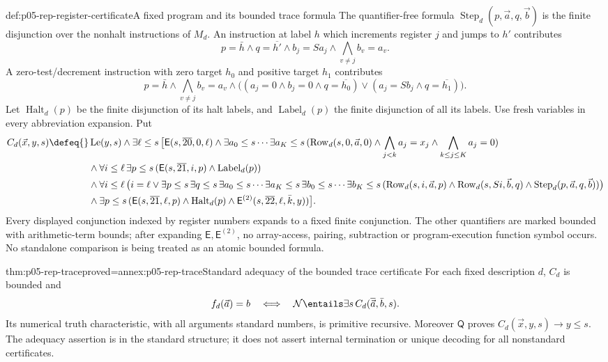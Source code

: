 \begin{hbdefinition}{def:p05-rep-register-certificate}{A fixed program and its bounded trace formula}
The quantifier-free formula
\(\operatorname{Step}_d(p,\vec a,q,\vec b)\) is the finite disjunction
over the nonhalt instructions of \(M_d\). An instruction at label \(h\)
which increments register \(j\) and jumps to \(h'\) contributes
\[
 p=\bar h\land q=\overline{h'}\land b_j=Sa_j
                       \land\bigwedge_{v\ne j}b_v=a_v.
\]
A zero-test/decrement instruction with zero target \(h_0\) and positive
target \(h_1\) contributes
\[
 p=\bar h\land\bigwedge_{v\ne j}b_v=a_v\land
 \bigl((a_j=0\land b_j=0\land q=\overline{h_0})\lor
       (a_j=Sb_j\land q=\overline{h_1})\bigr).
\]
Let \(\operatorname{Halt}_d(p)\) be the finite disjunction of its halt
labels, and \(\operatorname{Label}_d(p)\) the finite disjunction of all
its labels. Use fresh variables in every abbreviation expansion. Put
\[
\begin{aligned}
 C_d(\vec x,y,s)\defeq {}&\operatorname{Le}(y,s)\land
 \exists\ell\leq s\,\bigl[\mathsf E(s,\overline{20},0,\ell)\land
 \exists a_0\leq s\cdots\exists a_K\leq s\,
    (\operatorname{Row}_d(s,0,\vec a,0)\land
       \bigwedge_{j<k}a_j=x_j\land\bigwedge_{k\leq j\leq K}a_j=0)\\
 &\land\forall i\leq\ell\,\exists p\leq s\,
                         (\mathsf E(s,\overline{21},i,p)
                                      \land\operatorname{Label}_d(p))\\
 &\land\forall i\leq\ell\,\bigl(i=\ell\lor
   \exists p\leq s\,\exists q\leq s\,
   \exists a_0\leq s\cdots\exists a_K\leq s\,
   \exists b_0\leq s\cdots\exists b_K\leq s\,
    (\operatorname{Row}_d(s,i,\vec a,p)\land
     \operatorname{Row}_d(s,Si,\vec b,q)\land
                     \operatorname{Step}_d(p,\vec a,q,\vec b))\bigr)\\
 &\land\exists p\leq s\,
       (\mathsf E(s,\overline{21},\ell,p)\land\operatorname{Halt}_d(p)
                         \land\mathsf E^{(2)}(s,\overline{22},\ell,\bar k,y))
 \bigr].
\end{aligned}
\]
Every displayed conjunction indexed by register numbers expands to a fixed
finite conjunction. The other quantifiers are marked bounded with
arithmetic-term bounds; after expanding \(\mathsf E,\mathsf E^{(2)}\),
no array-access, pairing, subtraction or program-execution function symbol
occurs. No standalone comparison is being treated as an atomic bounded
formula.
\end{hbdefinition}

\begin{hbtheorem}{thm:p05-rep-trace}{proved=annex:p05-rep-trace}{Standard adequacy of the bounded trace certificate}
For each fixed description \(d\), \(C_d\) is bounded and
\[
 f_d(\vec a)=b\quad\Longleftrightarrow\quad
       \mathcal N\entails\exists s\,C_d(\overline{\vec a},\bar b,s).
\]
Its numerical truth characteristic, with all arguments standard numbers,
is primitive recursive. Moreover \(\mathsf Q\) proves
\(C_d(\vec x,y,s)\to y\leq s\).
The adequacy assertion is in the standard structure; it does not assert
internal termination or unique decoding for all nonstandard certificates.
\end{hbtheorem}


